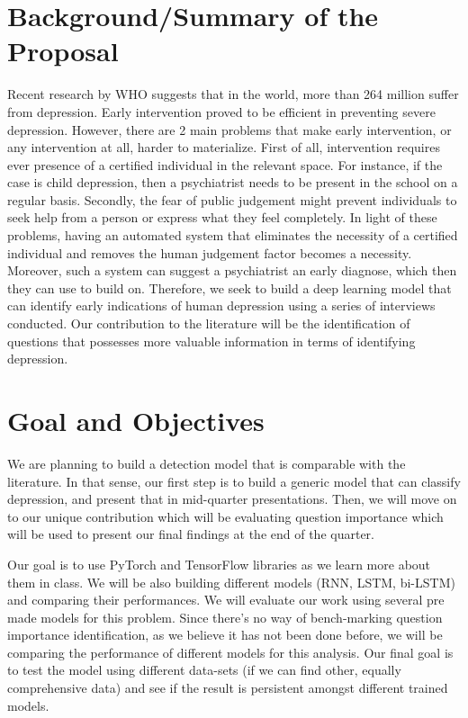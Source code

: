 
\newpage

\tableofcontents

\newpage




\section{Background/Summary of the Proposal}

Recent research by WHO suggests that in the world, more than 264 million suffer from depression. Early intervention proved to be efficient in preventing severe depression. However, there are 2 main problems that make early intervention, or any intervention at all, harder to materialize. First of all, intervention requires ever presence of a certified individual in the relevant space. For instance, if the case is child depression, then a psychiatrist needs to be present in the school on a regular basis. Secondly, the fear of public judgement might prevent individuals to seek help from a person or express what they feel completely. In light of these problems, having an automated system that eliminates the necessity of a certified individual and removes the human judgement factor becomes a necessity. Moreover, such a system can suggest a psychiatrist an early diagnose, which then they can use to build on. Therefore, we seek to build a deep learning model that can identify early indications of human depression using a series of interviews conducted. Our contribution to the literature will be the identification of questions that possesses more valuable information in terms of identifying depression.  

\section{Goal and Objectives}

We are planning to build a detection model that is comparable with the literature. In that sense, our first step is to build a generic model that can classify depression, and present that in mid-quarter presentations. Then, we will move on to our unique contribution which will be evaluating question importance which will be used to present our final findings at the end of the quarter.

Our goal is to use PyTorch and TensorFlow libraries as we learn more about them in class. We will be also building different models (RNN, LSTM, bi-LSTM) and comparing their performances. We will evaluate our work using several pre made models for this problem. Since there's no way of bench-marking question importance identification, as we believe it has not been done before, we will be comparing the performance of different models for this analysis. Our final goal is to test the model using different data-sets (if we can find other, equally comprehensive data) and see if the result is persistent amongst different trained models.


